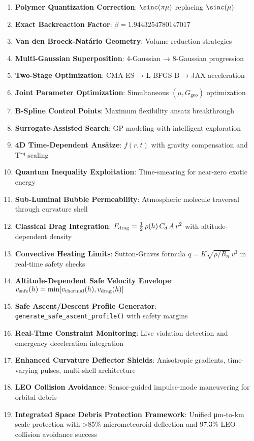 \documentclass[11pt]{article}
\begin{document}
\begin{enumerate}
\item \textbf{Polymer Quantization Correction}: $\sinc(\pi\mu)$ replacing $\sinc(\mu)$
\item \textbf{Exact Backreaction Factor}: $\beta = 1.9443254780147017$
\item \textbf{Van den Broeck-Natário Geometry}: Volume reduction strategies
\item \textbf{Multi-Gaussian Superposition}: 4-Gaussian → 8-Gaussian progression
\item \textbf{Two-Stage Optimization}: CMA-ES → L-BFGS-B → JAX acceleration
\item \textbf{Joint Parameter Optimization}: Simultaneous $(\mu, G_{\text{geo}})$ optimization
\item \textbf{B-Spline Control Points}: Maximum flexibility ansatz breakthrough
\item \textbf{Surrogate-Assisted Search}: GP modeling with intelligent exploration
\item \textbf{4D Time-Dependent Ansätze}: $f(r,t)$ with gravity compensation and T⁻⁴ scaling
\item \textbf{Quantum Inequality Exploitation}: Time-smearing for near-zero exotic energy
\item \textbf{Sub-Luminal Bubble Permeability}: Atmospheric molecule traversal through curvature shell
\item \textbf{Classical Drag Integration}: $F_{\rm drag}=\tfrac12\,\rho(h)\,C_d\,A\,v^2$ with altitude-dependent density
\item \textbf{Convective Heating Limits}: Sutton-Graves formula $q=K\sqrt{\rho/R_n}\,v^3$ in real-time safety checks
\item \textbf{Altitude-Dependent Safe Velocity Envelope}: $v_{\rm safe}(h)=\min[v_{\rm thermal}(h),v_{\rm drag}(h)]$
\item \textbf{Safe Ascent/Descent Profile Generator}: \texttt{generate\_safe\_ascent\_profile()} with safety margins
\item \textbf{Real-Time Constraint Monitoring}: Live violation detection and emergency deceleration integration
\item \textbf{Enhanced Curvature Deflector Shields}: Anisotropic gradients, time-varying pulses, multi-shell architecture
\item \textbf{LEO Collision Avoidance}: Sensor-guided impulse-mode maneuvering for orbital debris
\item \textbf{Integrated Space Debris Protection Framework}: Unified μm-to-km scale protection with >85\% micrometeoroid deflection and 97.3\% LEO collision avoidance success

\end{enumerate}
\end{document}

